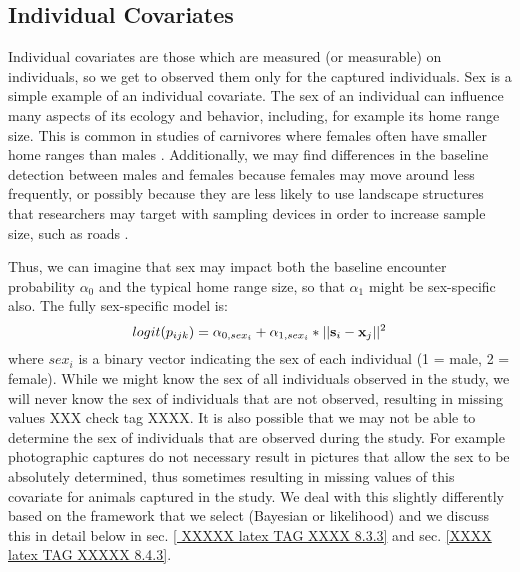 \subsection{Individual Covariates}

Individual covariates are those which are measured (or measurable) on
individuals, so we get to observed them only for the captured
individuals. Sex is a simple example of an individual covariate. 
The sex of an individual can influence many aspects of its ecology and behavior, including, for example its home range size. This is
common in studies of carnivores where females often have smaller home ranges than
males \citep{gardner_etal:2010jwm, sollmann_etal:2011}. Additionally, we may find differences in
the baseline detection between males and females because females may move around less frequently, or possibly because they are less likely to use landscape structures that researchers may target with sampling devices in order to increase sample size, such as roads \citep[e.g.][]{salom-perez_etal:2007}. 


Thus, we can imagine that sex may impact both the baseline encounter
probability $\alpha_{0}$ and the typical home range
size, so that
$\alpha_{1}$ might be sex-specific also.  The fully sex-specific model is:
\[
logit(p_{ijk}) = \alpha_{0,sex_{i}} + \alpha_{1, sex_{i}}*||{\bf s}_{i}-{\bf x}_{j}||^{2}  
\]
where $sex_{i}$ is a binary vector indicating the sex of
each individual (1 = male, 2 = female).  While we might know the sex of all
individuals observed in the study, we will never know the
sex of individuals that are not observed,
resulting in missing values \citep{gardner_etal:2010jwm} XXX check tag XXXX.
It is also possible that we may not be able to determine the sex of
individuals that are observed during the study. For example photographic
captures do not necessary result in pictures that allow the sex to be absolutely
determined, thus sometimes resulting in missing values of this covariate for animals
captured in the study.   We deal with this slightly differently based on the framework
that we select (Bayesian or likelihood) and we discuss this in detail
below in sec. \ref{ XXXXX latex TAG XXXX 8.3.3} and sec. \ref{XXXX latex TAG XXXXX 8.4.3}.

\begin{comment}
XXX whole section on this below so commented out here XXXXX
\subsection{Heterogeneity}

Heterogeneity is a covariate that is completely latent.  This can
include many things such as an additive individual effect or an
individual-specific effect of distance.  We address these models
separately in Section 8.5 below and show a simple example of a finite
mixture model carried out in secr in Section 8.4.4.
\end{comment}


